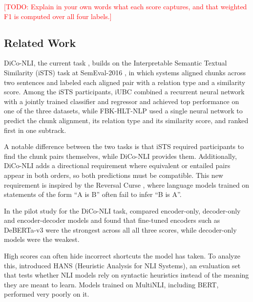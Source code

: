\documentclass[11pt]{article}
\newcommand{\todo}[1]{\textcolor{red}{[TODO: #1]}}
\begin{document}
\todo{Explain in your own words what each score captures, and that weighted F1 is computed over all four labels.}

\subsection{Related Work}

DiCo-NLI, the current task \citep{dico-nli-2027-task}, builds on the Interpretable Semantic Textual Similarity (iSTS) task at SemEval-2016 \citep{agirre-etal-2016-semeval-2016}, in which systems aligned chunks across two sentences and labeled each aligned pair with a relation type and a similarity score. Among the iSTS participants, iUBC \citep{lopez-gazpio-etal-2016-iubc} combined a recurrent neural network with a jointly trained classifier and regressor and achieved top performance on one of the three datasets, while FBK-HLT-NLP \citep{magnolini-etal-2016-fbk} used a single neural network to predict the chunk alignment, its relation type and its similarity score, and ranked first in one subtrack.

A notable difference between the two tasks is that iSTS required participants to find the chunk pairs themselves, while DiCo-NLI provides them. Additionally, DiCo-NLI adds a directional requirement where equivalent or entailed pairs appear in both orders, so both predictions must be compatible. This new requirement is inspired by the Reversal Curse \citep{berglund2024reversal}, where language models trained on statements of the form ``A is B'' often fail to infer ``B is A''.

In the pilot study for the DiCo-NLI task, \citet{apaolaza2026assessing} compared encoder-only, decoder-only and encoder-decoder models and found that fine-tuned encoders such as DeBERTa-v3 were the strongest across all all three scores, while decoder-only models were the weakest.

High scores can often hide incorrect shortcuts the model has taken. To analyze this, \citet{mccoy-etal-2019-right} introduced HANS (Heuristic Analysis for NLI Systems), an evaluation set that tests whether NLI models rely on syntactic heuristics instead of the meaning they are meant to learn. Models trained on MultiNLI, including BERT, performed very poorly on it.
\end{document}

